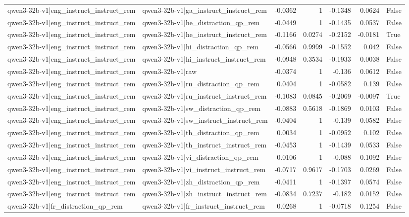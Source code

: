 \begin{table}
\begin{tabular}{l l r r r r l}
qwen3-32b-v1|eng_instruct_instruct_rem & qwen3-32b-v1|ga_instruct_instruct_rem & -0.0362 & 1 & -0.1348 & 0.0624 & False \\
qwen3-32b-v1|eng_instruct_instruct_rem & qwen3-32b-v1|he_distraction_qp_rem & -0.0449 & 1 & -0.1435 & 0.0537 & False \\
qwen3-32b-v1|eng_instruct_instruct_rem & qwen3-32b-v1|he_instruct_instruct_rem & -0.1166 & 0.0274 & -0.2152 & -0.0181 & True \\
qwen3-32b-v1|eng_instruct_instruct_rem & qwen3-32b-v1|hi_distraction_qp_rem & -0.0566 & 0.9999 & -0.1552 & 0.042 & False \\
qwen3-32b-v1|eng_instruct_instruct_rem & qwen3-32b-v1|hi_instruct_instruct_rem & -0.0948 & 0.3534 & -0.1933 & 0.0038 & False \\
qwen3-32b-v1|eng_instruct_instruct_rem & qwen3-32b-v1|raw & -0.0374 & 1 & -0.136 & 0.0612 & False \\
qwen3-32b-v1|eng_instruct_instruct_rem & qwen3-32b-v1|ru_distraction_qp_rem & 0.0404 & 1 & -0.0582 & 0.139 & False \\
qwen3-32b-v1|eng_instruct_instruct_rem & qwen3-32b-v1|ru_instruct_instruct_rem & -0.1083 & 0.0845 & -0.2069 & -0.0097 & True \\
qwen3-32b-v1|eng_instruct_instruct_rem & qwen3-32b-v1|sw_distraction_qp_rem & -0.0883 & 0.5618 & -0.1869 & 0.0103 & False \\
qwen3-32b-v1|eng_instruct_instruct_rem & qwen3-32b-v1|sw_instruct_instruct_rem & -0.0404 & 1 & -0.139 & 0.0582 & False \\
qwen3-32b-v1|eng_instruct_instruct_rem & qwen3-32b-v1|th_distraction_qp_rem & 0.0034 & 1 & -0.0952 & 0.102 & False \\
qwen3-32b-v1|eng_instruct_instruct_rem & qwen3-32b-v1|th_instruct_instruct_rem & -0.0453 & 1 & -0.1439 & 0.0533 & False \\
qwen3-32b-v1|eng_instruct_instruct_rem & qwen3-32b-v1|vi_distraction_qp_rem & 0.0106 & 1 & -0.088 & 0.1092 & False \\
qwen3-32b-v1|eng_instruct_instruct_rem & qwen3-32b-v1|vi_instruct_instruct_rem & -0.0717 & 0.9617 & -0.1703 & 0.0269 & False \\
qwen3-32b-v1|eng_instruct_instruct_rem & qwen3-32b-v1|zh_distraction_qp_rem & -0.0411 & 1 & -0.1397 & 0.0574 & False \\
qwen3-32b-v1|eng_instruct_instruct_rem & qwen3-32b-v1|zh_instruct_instruct_rem & -0.0834 & 0.7237 & -0.182 & 0.0152 & False \\
qwen3-32b-v1|fr_distraction_qp_rem & qwen3-32b-v1|fr_instruct_instruct_rem & 0.0268 & 1 & -0.0718 & 0.1254 & False \\

\end{tabular}
\end{table}
